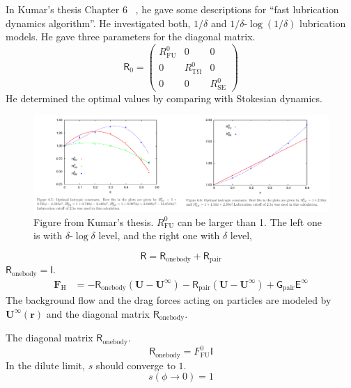 \documentclass[12pt]{article}
\newcommand{\tens}[1]{\bm{\mathsf{#1}}}
\begin{document}
In Kumar's thesis Chapter 6 ~\citep{Kumar_2010a},
he gave some descriptions for ``fast lubrication dynamics algorithm''.
%
He investigated both, $1/\delta$ 
and $1/\delta$-$\log(1/\delta)$ lubrication models.
%
He gave three parameters for the diagonal matrix.
\begin{equation}
 \tens{R}_{\mathrm{0}}
=
\begin{pmatrix}
 R_{\mathrm{FU}}^{0} & 0 & 0 \\
 0 &  R_{\mathrm{T\Omega}}^{0}  & 0 \\
 0 &  0 &  R_{\mathrm{SE}}^{0}  
\end{pmatrix}
\end{equation}
He determined the optimal values by comparing with Stokesian dynamics.
\begin{figure}[htbp]
\centering
\includegraphics[width=16cm]{kumars_Rfu0.pdf} 
\caption{
Figure from Kumar's thesis.
$R_{\mathrm{FU}}^{0 }$ can be larger than 1.
%
The left one is with $\delta$-$\log \delta $ level,
and the right one with $\delta$ level,
}
\end{figure}


\begin{equation}
 \tens{R} =  \tens{R}_{\mathrm{onebody}} + \tens{R}_{\mathrm{pair}}
\end{equation}
$\tens{R}_{\mathrm{onebody}} = \tens{I}$.
\begin{align*}
\bm{F}_{\mathrm{H}} 
&=
 - \tens{R}_{\mathrm{onebody}}(\bm{U}-\bm{U}^{\infty})  
 - \tens{R}_{\mathrm{pair}}(\bm{U}-\bm{U}^{\infty})  
+  \tens{G}_{\mathrm{pair}} \tens{E}^{\infty}  
\end{align*}
%
The background flow and the drag forces acting on particles
are modeled by
$\bm{U}^{\infty}(\bm{r})$ and
the diagonal matrix $\tens{R}_{\mathrm{onebody}}$.
%

The diagonal matrix $\tens{R}_{\mathrm{onebody}}$.
%
\begin{equation}
 \tens{R}_{\mathrm{onebody}} 
= F_{\mathrm{FU}}^{0} \tens{I}
\end{equation}
%
In the dilute limit, $s$ should converge to $1$.
\begin{equation}
  s (\phi \to 0) = 1
\end{equation}
\end{document}
